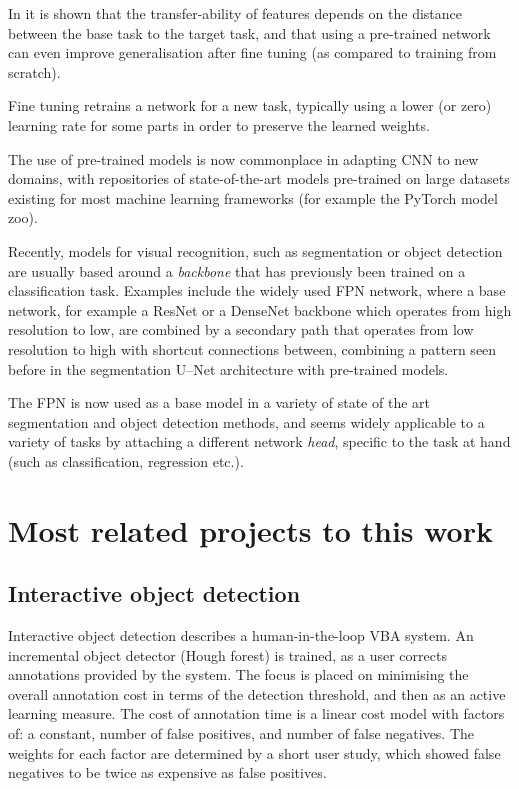 In \cite{Yosinski} it is shown that the transfer-ability of features depends on the distance between the base task to the target task, and that using a pre-trained network can even improve generalisation after fine tuning (as compared to training from scratch).

Fine tuning retrains a network for a new task, typically using a lower (or zero) learning rate for some parts in order to preserve the learned weights. 

The use of pre-trained models is now commonplace in adapting \gls{CNN} to new domains, with repositories of state-of-the-art models pre-trained on large datasets existing for most machine learning frameworks (for example the PyTorch \cite{Paszke2017} model zoo). 

Recently, models for visual recognition, such as segmentation or object detection are usually based around a \emph{backbone} that has previously been trained on a classification task. Examples include the widely used \gls{FPN} network, \cite{Lin2017a} where a base network, for example a ResNet \cite{He} or a DenseNet \cite{Huang2016} backbone which operates from high resolution to low, are combined by a secondary path that operates from low resolution to high with shortcut connections between, combining a pattern seen before in the segmentation U--Net \cite{Ronneberger2015} architecture with pre-trained models.

The \gls{FPN} is now used as a base model in a variety of state of the art segmentation and object detection methods, and seems widely applicable to a variety of tasks by attaching a different network \emph{head}, specific to the task at hand (such as classification, regression etc.).


\section {Most related projects to this work}
\label{sec:closest}

\subsection {Interactive object detection \cite{Yao2012}}

Interactive object detection \cite{Yao2012} describes a human-in-the-loop \gls{VBA} system. An incremental object detector (Hough forest) is trained, as a user corrects annotations provided by the system. The focus is placed on minimising the overall annotation cost in terms of the detection threshold, and then as an active learning measure. 
The cost of annotation time is a linear cost model with factors of: a constant, number of false positives, and number of false negatives. The weights for each factor are determined by a short user study, which showed false negatives to be twice as expensive as false positives. 

